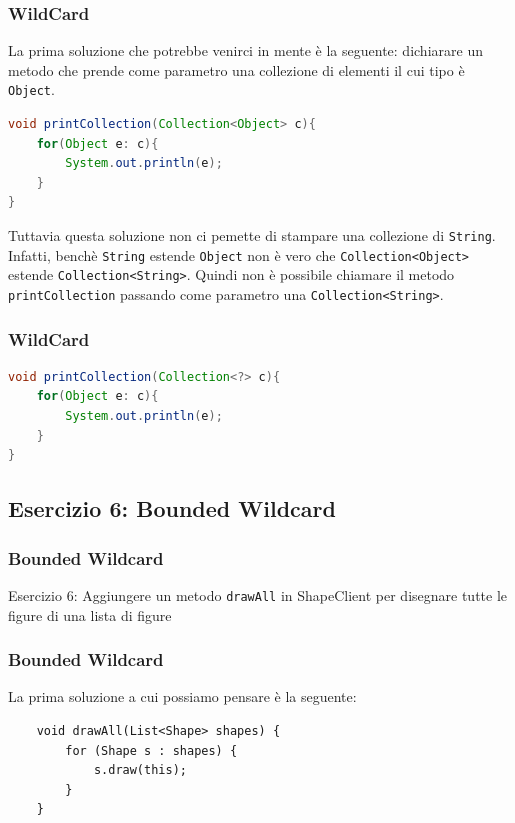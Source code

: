 \documentclass{beamer}
\begin{document}
\begin{frame}[fragile]
\frametitle{WildCard}
La prima soluzione che potrebbe venirci in mente \`e la seguente: dichiarare un metodo che prende come parametro una collezione di elementi il cui tipo \`e \texttt{Object}.
\begin{framed}
\begin{lstlisting}[language=Java]
void printCollection(Collection<Object> c){
    for(Object e: c){
        System.out.println(e);    
    }
}
\end{lstlisting}
\end{framed}
 Tuttavia questa soluzione non ci pemette di stampare una collezione di \texttt{String}. Infatti, bench\`e \texttt{String} estende \texttt{Object} non \`e vero che \texttt{Collection<Object>} estende \texttt{Collection<String>}. Quindi non \`e possibile chiamare il metodo \texttt{printCollection} passando come parametro una \texttt{Collection<String>}.
\end{frame}
%
\begin{frame}[fragile]
\frametitle{WildCard}
\begin{framed}
\begin{lstlisting}[language=Java]
void printCollection(Collection<?> c){
    for(Object e: c){
        System.out.println(e);    
    }
}
\end{lstlisting}
\end{framed}
\end{frame}

\subsection{Esercizio 6: Bounded Wildcard}
\begin{frame}[fragile]
\frametitle{Bounded Wildcard}
\begin{framed}
Esercizio 6: Aggiungere un metodo \texttt{drawAll} in ShapeClient per disegnare tutte le figure di una lista di figure
\end{framed}
\end{frame}


\begin{frame}[fragile]
\frametitle{Bounded Wildcard}
	La prima soluzione a cui possiamo pensare \`e la seguente:
	\begin{framed}
	\begin{lstlisting}
	void drawAll(List<Shape> shapes) { 
	    for (Shape s : shapes) {
	        s.draw(this); 
	    }
	}
	\end{lstlisting}
\end{framed}
\end{frame}
\end{document}
